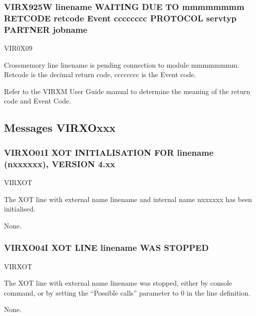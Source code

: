 \documentclass[letterpaper,10pt,english]{sphinxmanual}
\begin{document}
\subsubsection{VIRX925W linename WAITING DUE TO mmmmmmmm RETCODE retcode Event cccccccc PROTOCOL servtyp PARTNER jobname}
\label{\detokenize{messages:virx925w-linename-waiting-due-to-mmmmmmmm-retcode-retcode-event-cccccccc-protocol-servtyp-partner-jobname}}\begin{description}
\sphinxAtStartPar
VIR0X09

\sphinxAtStartPar
Cross\sphinxhyphen{}memory line linename is pending connection to module mmmmmmmm. Retcode is the decimal return code, cccccccc is the Event code.

\sphinxAtStartPar
Refer to the VIRXM User Guide manual to determine the meaning of the return code and Event Code.

\end{description}


\subsection{Messages VIRXOxxx}
\label{\detokenize{messages:messages-virxoxxx}}

\subsubsection{VIRXO01I XOT INITIALISATION FOR linename (n\sphinxhyphen{}xxxxxx), VERSION 4.xx}
\label{\detokenize{messages:virxo01i-xot-initialisation-for-linename-n-xxxxxx-version-4-xx}}\begin{description}
\sphinxAtStartPar
VIRXOT

\sphinxAtStartPar
The XOT line with external name linename and internal name n\sphinxhyphen{}xxxxxx has been initialised.

\sphinxAtStartPar
None.

\end{description}


\subsubsection{VIRXO04I XOT LINE linename WAS STOPPED}
\label{\detokenize{messages:virxo04i-xot-line-linename-was-stopped}}\begin{description}
\sphinxAtStartPar
VIRXOT

\sphinxAtStartPar
The XOT line with external name linename was stopped, either by console command, or by setting the “Possible calls” parameter to 0 in the line definition.

\sphinxAtStartPar
None.

\end{description}
\end{document}
